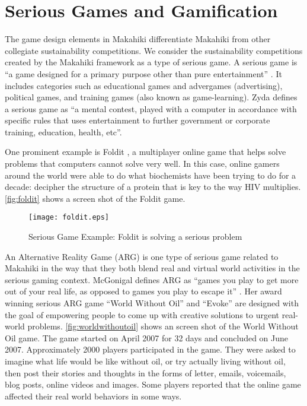 \section {Serious Games and Gamification}
\label{sec:rel-seriousgame}

The game design elements in Makahiki differentiate Makahiki from other collegiate sustainability competitions. We consider the sustainability competitions created by the Makahiki framework as a type of serious game.  A serious game is ``a game designed for a primary purpose other than pure entertainment'' \cite {WikipediaSeriousGame}. It includes categories such as educational games and advergames (advertising), political games, and training games (also known as game-learning). Zyda \cite{Zyda2005} defines a serious game as ``a mental contest, played with a computer in accordance with specific rules that uses entertainment to further government or corporate training, education, health, etc''. 

One prominent example is Foldit \cite {khatib2011crystal}, a multiplayer online game that helps solve problems that computers cannot solve very well. In this case, online gamers around the world were able to do what biochemists have been trying to do for a decade: decipher the structure of a protein that is key to the way HIV multiplies. \autoref{fig:foldit} shows a screen shot of the Foldit game.

\begin{figure}[ht!]
	\centering
		\texttt{[image: foldit.eps]}
		\caption{Serious Game Example: Foldit is solving a serious problem \cite {khatib2011crystal}} 
		\label{fig:foldit}
\end{figure}

An Alternative Reality Game (ARG) is one type of serious game related to Makahiki in the way that they both  blend real and virtual world activities in the serious gaming context. McGonigal defines ARG as ``games you play to get more out of your real life, as opposed to games you play to escape it'' \cite{mcgonigal2011reality}. Her award winning serious ARG game ``World Without Oil'' \cite{worldwithoutoil} and ``Evoke'' \cite{urgentevoke} are designed with the goal of empowering people to come up with creative solutions to urgent real-world problems. \autoref{fig:worldwithoutoil} shows an screen shot of the World Without Oil game. The game started on April 2007 for 32 days and concluded on June 2007. Approximately 2000 players participated in the game. They were asked to imagine what life would be like without oil, or try actually living without oil, then post their stories and thoughts in the forms of letter, emails, voicemails, blog posts, online videos and images. Some players reported that the online game affected their real world behaviors in some ways\cite{mcgonigal2011reality}.

